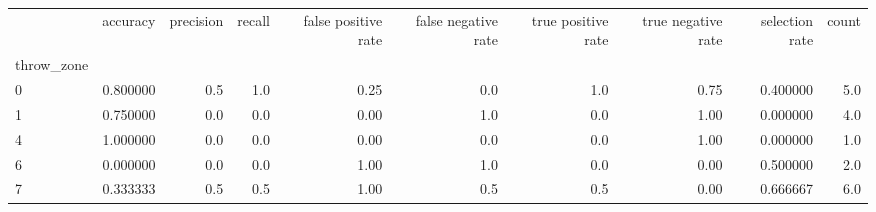 \begin{tabular}{lrrrrrrrrr}
\toprule
{} &  accuracy &  precision &  recall &  false positive rate &  false negative rate &  true positive rate &  true negative rate &  selection rate &  count \\
throw\_zone &           &            &         &                      &                      &                     &                     &                 &        \\
\midrule
0          &  0.800000 &        0.5 &     1.0 &                 0.25 &                  0.0 &                 1.0 &                0.75 &        0.400000 &    5.0 \\
1          &  0.750000 &        0.0 &     0.0 &                 0.00 &                  1.0 &                 0.0 &                1.00 &        0.000000 &    4.0 \\
4          &  1.000000 &        0.0 &     0.0 &                 0.00 &                  0.0 &                 0.0 &                1.00 &        0.000000 &    1.0 \\
6          &  0.000000 &        0.0 &     0.0 &                 1.00 &                  1.0 &                 0.0 &                0.00 &        0.500000 &    2.0 \\
7          &  0.333333 &        0.5 &     0.5 &                 1.00 &                  0.5 &                 0.5 &                0.00 &        0.666667 &    6.0 \\
\bottomrule
\end{tabular}
